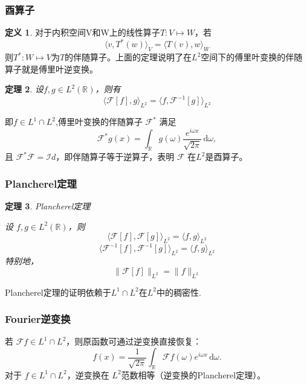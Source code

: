 \documentclass[12pt,a4paper]{article}
\theoremstyle{plain}
\newtheorem{theorem}{定理}[section]
\theoremstyle{definition}
\newtheorem{definition}[theorem]{定义}
\theoremstyle{remark}
\begin{document}
\subsubsection{酉算子}


\begin{definition}
	对于内积空间V和W上的线性算子\( T: V \mapsto W \)，若
	\[
	\langle v, T^*(w) \rangle_V = \langle T(v), w \rangle_W
	\]
	则\( T^*: W \mapsto V \)为\( T \)的伴随算子。上面的定理说明了在$L^2$空间下的傅里叶变换的伴随算子就是傅里叶逆变换。
\end{definition}

\begin{theorem}
	设\( f, g \in L^2(\mathbb{R}) \)，则有
	\[
	\langle \mathcal{F}[f], g \rangle_{L^2} = \langle f, \mathcal{F}^{-1}[g] \rangle_{L^2}
	\]
\end{theorem}

即\( f \in L^1 \cap L^2 \),傅里叶变换的伴随算子 \( \mathcal{F}^* \) 满足
\[
\mathcal{F}^* g(x) = \int_{\mathbb{R}} g(\omega) \frac{e^{i\omega x}}{\sqrt{2\pi}} \, \mathrm{d}\omega,
\]
且 \( \mathcal{F}^* \mathcal{F} = \mathcal{I}d \)，即伴随算子等于逆算子，表明 \( \mathcal{F} \) 在$L^2$是酉算子。

\subsubsection{Plancherel定理}
\begin{theorem}Plancherel定理
	
	设 \( f, g \in L^2(\mathbb{R}) \)，则
	\[
	\langle \mathcal{F}[f], \mathcal{F}[g] \rangle_{L^2} = \langle f, g \rangle_{L^2}
	\]
	\[
	\langle \mathcal{F}^{-1}[f], \mathcal{F}^{-1}[g] \rangle_{L^2} = \langle f, g \rangle_{L^2}
	\]
特别地，
\[
\| \mathcal{F}[f] \|_{L^2} = \| f \|_{L^2}
\]
\end{theorem}
Plancherel定理的证明依赖于$L^1\cap L^2$在$L^2$中的稠密性.


\subsubsection{Fourier逆变换}
若 \( \mathcal{F}f \in L^1 \cap L^2 \)，则原函数可通过逆变换直接恢复：
\[
f(x) = \frac{1}{\sqrt{2\pi}} \int_{\mathbb{R}} \mathcal{F}f(\omega) e^{i\omega x} \, \mathrm{d}\omega.
\]
对于 \( f \in L^1 \cap L^2 \)，逆变换在 \( L^2 \)范数相等（逆变换的Plancherel定理）。
\end{document}
